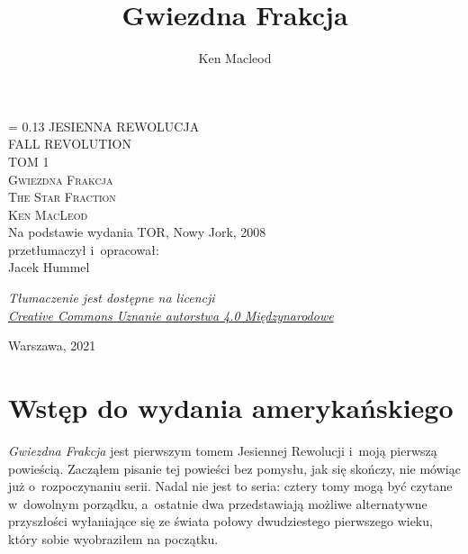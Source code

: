 \documentclass[oneside,polish,11pt,sfheadings]{mwbk}
\begin{document}
\title{Gwiezdna Frakcja}
\author{Ken Macleod}

\DeclareRobustCommand{\cs}[1]{\texttt{\char`\\#1}}
\newlength{\tpheight}\setlength{\tpheight}{0.9\textheight}
\newlength{\txtheight}\setlength{\txtheight}{0.9\tpheight}
\newlength{\tpwidth}\setlength{\tpwidth}{0.9\textwidth}
\newlength{\txtwidth}\setlength{\txtwidth}{0.9\tpwidth}
\newlength{\drop}
\newcommand*{\titleSI}{\begingroup%
\drop = 0.13\txtheight
\centering
{\Huge \textsf{JESIENNA REWOLUCJA} }\\[1\baselineskip]
{\huge \textsf{FALL REVOLUTION}}\\[1\baselineskip]
{\LARGE  \textsf{TOM 1}}\\[4\baselineskip]
{\Huge \textsc{Gwiezdna Frakcja}}\\[1\baselineskip]
{\LARGE \textsc{The Star Fraction}}\\[2\baselineskip]
{\huge \textsc{Ken MacLeod}}\\[4\baselineskip]
{\large Na podstawie wydania TOR, Nowy Jork, 2008 \\ przetłumaczył i~opracował:}\\
{\Large Jacek Hummel}\\[2\baselineskip]
{\normalsize \textit{Tłumaczenie jest dostępne na licencji\\
\href{https://creativecommons.org/licenses/by/4.0/deed.pl}{Creative Commons Uznanie autorstwa 4.0 Międzynarodowe}}\\[2\baselineskip]\par}
\vfill
{\Large {Warszawa, 2021}}\\
\endgroup}
\titleSI
\thispagestyle{empty}
\newpage

\begin{figure}[p]
    \vspace*{-1cm}
\end{figure}
\thispagestyle{empty}


\newpage


\chapter*{Wstęp do wydania amerykańskiego} 

\emph{Gwiezdna Frakcja} jest pierwszym tomem Jesiennej Rewolucji i~moją
pierwszą powieścią. Zacząłem pisanie tej powieści bez pomysłu, jak się
skończy, nie mówiąc już o~rozpoczynaniu serii. Nadal nie jest to seria:
cztery tomy mogą być czytane w~dowolnym porządku, a~ostatnie dwa
przedstawiają możliwe alternatywne przyszłości wyłaniające się ze świata
połowy dwudziestego pierwszego wieku, który sobie wyobraziłem na
początku.
\end{document}
